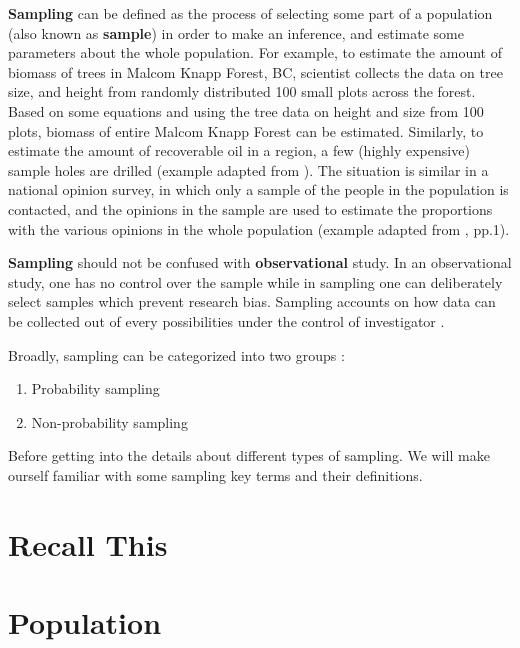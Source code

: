 \documentclass[
]{book}
\providecommand{\tightlist}{%
  \setlength{\itemsep}{0pt}\setlength{\parskip}{0pt}}
\begin{document}
\textbf{Sampling} can be defined as the process of selecting some part of a population (also known as \textbf{sample}) in order to make an inference, and estimate some parameters about the whole population\citep{thompson_sampling_2012}. For example, to estimate the amount of biomass of trees in Malcom Knapp Forest, BC, scientist collects the data on tree size, and height from randomly distributed 100 small plots across the forest. Based on some equations and using the tree data on height and size from 100 plots, biomass of entire Malcom Knapp Forest can be estimated. Similarly, to estimate the amount of recoverable oil in a region, a few (highly expensive) sample holes are drilled (example adapted from \citet{thompson_sampling_2012}). The situation is similar in a national opinion survey, in which only a sample of the people in the population is contacted, and the opinions in the sample are used to estimate the proportions with the various opinions in the whole population (example adapted from \citet{thompson_sampling_2012}, pp.1).

\textbf{Sampling} should not be confused with \textbf{observational} study. In an observational study, one has no control over the sample while in sampling one can deliberately select samples which prevent research bias\citep{thompson_sampling_2012}. Sampling accounts on how data can be collected out of every possibilities under the control of investigator \citep{thompson_sampling_2012}.

Broadly, sampling can be categorized into two groups \citep{teddlie_mixed_2007}:

\begin{enumerate}
\def\labelenumi{\arabic{enumi}.}
\tightlist
\item
  Probability sampling
\item
  Non-probability sampling
\end{enumerate}

Before getting into the details about different types of sampling. We will make ourself familiar with some sampling key terms and their definitions.

\hypertarget{recall-this-1}{%
\section*{Recall This}\label{recall-this-1}}

\hypertarget{population}{%
\section{Population}\label{population}}
\end{document}
